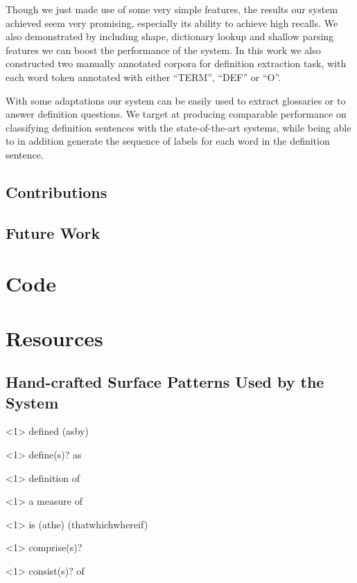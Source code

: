 \documentclass[hyp]{socreport}
\begin{document}
Though we just made use of some very simple features, the results our system achieved seem very promising, especially its ability to achieve high recalls. We also demonstrated by including shape, dictionary lookup and shallow parsing features we can boost the performance of the system. In this work we also constructed two manually annotated corpora for definition extraction task, with each word token annotated with either ``TERM'', ``DEF'' or ``O''. 

With some adaptations our system can be easily used to extract glossaries or to answer definition questions. We target at producing comparable performance on classifying definition sentences with the state-of-the-art systems, while being able to in addition generate the sequence of labels for each word in the definition sentence. 

\section{Contributions}
\section{Future Work}




\appendix
\chapter{Code}

\chapter{Resources}
\section{Hand-crafted Surface Patterns Used by the System}
\textless{}1\textgreater{}  defined (as\textvert{}by) 

\textless{}1\textgreater{} define(s)?  as 

\textless{}1\textgreater{} definition of  

\textless{}1\textgreater{}  a measure of 

\textless{}1\textgreater{}  is (a\textvert{}the)  (that\textvert{}which\textvert{}where\textvert{}if)

\textless{}1\textgreater{}  comprise(s)? 

\textless{}1\textgreater{}  consist(s)? of 
\end{document}
